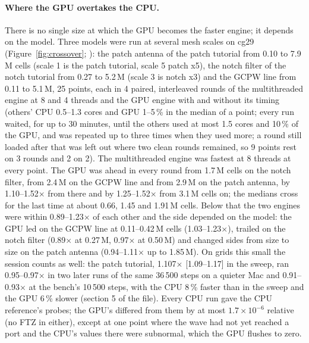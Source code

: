 \paragraph{Where the GPU overtakes the CPU.} There is no single size at which the GPU becomes the faster engine; it
depends on the model. Three models were run at several mesh scales on cg29 (Figure~\ref{fig:crossover};
): the patch antenna of the patch tutorial from 0.10 to 7.9\,M cells
(scale 1 is the patch tutorial, scale 5 patch x5), the notch filter of the notch tutorial from 0.27 to 5.2\,M (scale 3
is notch x3) and the GCPW line from 0.11 to 5.1\,M, 25 points, each in 4 paired, interleaved rounds of the
multithreaded engine at 8 and 4 threads and the GPU engine with and without its timing (others' CPU 0.5--1.3 cores
and GPU 1--5\,\% in the median of a point; every run waited, for up to 30 minutes, until the others used at most 1.5 cores and
10\,\% of the GPU, and was repeated up to three times when they used more; a round still loaded after that was left
out where two clean rounds remained, so 9 points rest on 3 rounds and 2 on 2). The multithreaded engine was fastest at 8 threads at every point. The GPU was ahead in every
round from 1.7\,M cells on the notch filter, from 2.4\,M on the GCPW line and from 2.9\,M on the patch antenna, by
1.10--1.52$\times$ from there and by 1.25--1.52$\times$ from 3.1\,M cells on; the medians cross for the last time at about 0.66, 1.45
and 1.91\,M cells. Below that the two engines were within 0.89--1.23$\times$ of each other and the side depended on
the model: the GPU led on the GCPW line at 0.11--0.42\,M cells (1.03--1.23$\times$), trailed on the notch filter
(0.89$\times$ at 0.27\,M, 0.97$\times$ at 0.50\,M) and changed sides from size to size on the patch antenna
(0.94--1.11$\times$ up to 1.85\,M). On grids this small the session counts as well: the patch tutorial, 1.107$\times$
[1.09--1.17] in the sweep, ran 0.95--0.97$\times$ in two later runs of the same 36\,500 steps on a quieter Mac and
0.91--0.93$\times$ at the bench's 10\,500 steps, with the CPU 8\,\% faster than in the sweep and the GPU 6\,\% slower
(section 5 of the file). Every CPU run gave the CPU reference's probes; the GPU's differed from them by at most
$1.7\times10^{-6}$ relative (no FTZ in either), except at one point where the wave had not yet reached a port and the CPU's values there were
subnormal, which the GPU flushes to zero.

